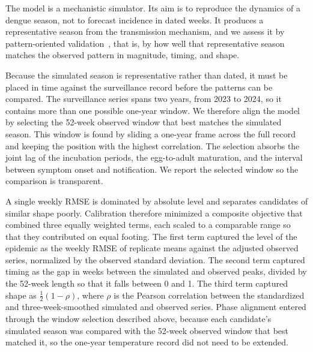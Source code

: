 \documentclass[applsci,article,accept,pdftex,moreauthors]{Definitions/mdpi}
\begin{document}
The model is a mechanistic simulator. Its aim is to reproduce the dynamics of a dengue season, not to forecast incidence in dated weeks. It produces a representative season from the transmission mechanism, and we assess it by pattern-oriented validation~\cite{validationOverview}, that is, by how well that representative season matches the observed pattern in magnitude, timing, and shape.

Because the simulated season is representative rather than dated, it must be placed in time against the surveillance record before the patterns can be compared. The surveillance series spans two years, from 2023 to 2024, so it contains more than one possible one-year window. We therefore align the model by selecting the 52-week observed window that best matches the simulated season. This window is found by sliding a one-year frame across the full record and keeping the position with the highest correlation. The selection absorbs the joint lag of the incubation periods, the egg-to-adult maturation, and the interval between symptom onset and notification. We report the selected window so the comparison is transparent.

A single weekly RMSE is dominated by absolute level and separates candidates of similar shape poorly. Calibration therefore minimized a composite objective that combined three equally weighted terms, each scaled to a comparable range so that they contributed on equal footing. The first term captured the level of the epidemic as the weekly RMSE of replicate means against the adjusted observed series, normalized by the observed standard deviation. The second term captured timing as the gap in weeks between the simulated and observed peaks, divided by the 52-week length so that it falls between 0 and 1. The third term captured shape as $\tfrac{1}{2}(1-\rho)$, where $\rho$ is the Pearson correlation between the standardized and three-week-smoothed simulated and observed series. Phase alignment entered through the window selection described above, because each candidate's simulated season was compared with the 52-week observed window that best matched it, so the one-year temperature record did not need to be extended.
\end{document}

